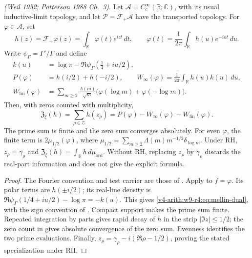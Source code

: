 \begin{proposition}
\label{v4-arith:w9-r4:prop:mellin-dual}
\ClaimStatusProvedElsewhere \emph{(Weil 1952; Patterson 1988 Ch.~3)}.
Let \(\mathscr A=C_c^\infty(\mathbb R;\mathbb C)\), with its usual
inductive-limit topology, and let \(\mathscr P=\mathcal F_+\mathscr A\)
have the transported topology. For \(\varphi\in\mathscr A\), set
\[
 h(z)=\mathcal F_+\varphi(z)=\int_{\mathbb R}\varphi(t)e^{izt}\,dt,
 \qquad
 \varphi(t)=\frac1{2\pi}\int_{\mathbb R}h(u)e^{-iut}\,du.
\]
Write \(\psi_\Gamma=\Gamma'/\Gamma\) and define
\begin{align*}
 k(u)&=\log\pi-\Re\psi_\Gamma(\tfrac14+iu/2),\\
 P(\varphi)&=h(i/2)+h(-i/2),\qquad
 W_\infty(\varphi)=\frac1{2\pi}\int_{\mathbb R}h(u)k(u)\,du,\\
 W_{\mathrm{fin}}(\varphi)&=
 \sum_{m\ge2}\frac{\Lambda(m)}{\sqrt m}
             \bigl(\varphi(\log m)+\varphi(-\log m)\bigr).
\end{align*}
Then, with zeros counted with multiplicity,
\begin{equation}
\label{v4-arith:w9-r4:eq:mellin-dual}
 \mathfrak Z_\xi(h)=\sum_{\rho\in\mathcal Z}h(z_\rho)
 =P(\varphi)-W_\infty(\varphi)-W_{\mathrm{fin}}(\varphi).
\end{equation}
The prime sum is finite and the zero sum converges absolutely.
For even \(\varphi\), the finite term is
\(2\mu_{1/2}(\varphi)\), where
\(\mu_{1/2}=\sum_{m\ge2}\Lambda(m)m^{-1/2}\delta_{\log m}\).
Under RH, \(z_\rho=\gamma_\rho\) and
\(\mathfrak Z_\xi(h)=\int_{\mathbb R}h\,d\mu_{\mathrm{ord}}\).
Without RH, replacing \(z_\rho\) by \(\gamma_\rho\) discards the
real-part information and does not give the explicit formula.
\end{proposition}
\begin{proof}
The Fourier convention and test carrier are those of
. Apply
 to \(f=\varphi\).
Its polar terms are \(h(\pm i/2)\); its real-line density is
\(\Re\psi_\Gamma(1/4+iu/2)-\log\pi=-k(u)\).
This gives \eqref{v4-arith:w9-r4:eq:mellin-dual}, with the sign
convention of .
Compact support makes the prime sum finite. Repeated integration
by parts gives rapid decay of \(h\) in the strip
\(|\Im z|\le1/2\); the zero count in
 gives absolute convergence of the zero
sum. Evenness identifies the two prime evaluations. Finally,
\(z_\rho=\gamma_\rho-i(\Re\rho-1/2)\), proving the stated
specialization under RH.
\end{proof}

